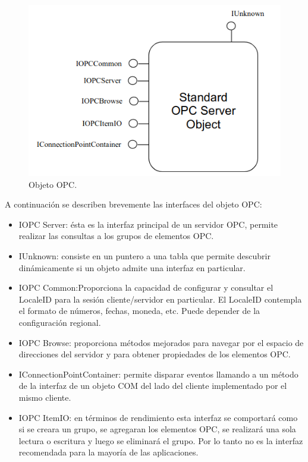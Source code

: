 \begin{figure}[htpb]
	\centering
	\includegraphics[scale=0.5]{./Figures/opc_3.png}
	\caption{Objeto OPC\protect\footnotemark.}
	\label{fig:OPCapi}
\end{figure}


A continuación se describen brevemente las interfaces del objeto OPC:

\begin{itemize}
\item IOPC Server: ésta es la interfaz principal de un servidor OPC, permite realizar las consultas a los grupos de elementos OPC.
\item IUnknown: consiste en un puntero a una tabla que permite descubrir dinámicamente si un objeto admite una interfaz en particular.
\item IOPC Common:Proporciona la capacidad de configurar y consultar el LocaleID para la sesión cliente/servidor en particular. El LocaleID contempla el formato de números, fechas, moneda, etc. Puede depender de la configuración regional.
\item IOPC Browse: proporciona métodos mejorados para navegar por el espacio de direcciones del servidor y para
obtener propiedades de los elementos OPC.
\item IConnectionPointContainer: permite disparar eventos llamando a un método de la interfaz de un objeto COM del lado del cliente implementado por el mismo cliente.
\item IOPC ItemIO: en términos de rendimiento esta interfaz se comportará como si se creara un grupo, se agregaran los elementos OPC, se realizará una sola lectura o escritura y luego se eliminará el grupo. Por lo tanto no es la interfaz recomendada para la mayoría de las aplicaciones.
\end{itemize}

